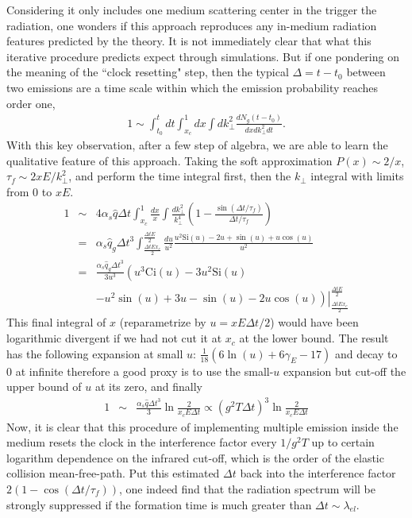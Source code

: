 Considering it only includes one medium scattering center in the trigger the radiation, one wonders if this approach reproduces any in-medium radiation features predicted by the theory.
It is not immediately clear that what this iterative procedure predicts  expect through simulations. 
But if one pondering on the meaning of the ``clock resetting" step, then the typical $\Delta = t-t_0$ between two emissions are a time scale within which the emission probability reaches order one,
\begin{eqnarray}
1 \sim \int_{t_0}^{t} dt\int_{x_c}^1 dx \int dk_\perp^2 \frac{dN_g(t-t_0)}{dx dk_\perp^2 dt}.
\end{eqnarray}
With this key observation, after a few step of algebra, we are able to learn the qualitative feature of this approach.
Taking the soft approximation $P(x) \sim 2/x$, $\tau_f\sim 2xE/k_\perp^2$, and perform the time integral first, then the $k_\perp$ integral with limits from $0$ to $xE$.
\begin{eqnarray}
1 &\sim& 4\alpha_s\hat{q}\Delta t \int_{x_c}^1 \frac{dx}{x} \int \frac{dk_\perp^2}{k_\perp^4}\left(1-\frac{\sin(\Delta t/\tau_f)}{\Delta t/\tau_f}\right)\\
&=& \alpha_s\hat{q}_g \Delta t^3 \int_{\frac{\Delta t E x_c}{2}}^{\frac{\Delta t E}{2}} 
\frac{du}{u^2} \frac{u^2 \mathrm{Si}(u) -2u + \sin(u) + u\cos(u)}{u^2}\\
&=& \frac{\alpha_s\hat{q}_g \Delta t^3}{3u^3} \left(
u^3\mathrm{Ci}(u)-3u^2\mathrm{Si}(u) \right.\\\nonumber
&&\left.\left.- u^2 \sin(u) +3u-\sin(u) - 2u\cos(u)\right)\right|_{\frac{\Delta t E x_c}{2}}^{\frac{\Delta t E}{2}} 
\end{eqnarray}
This final integral of $x$ (reparametrize by $u = xE\Delta t/2$) would have been logarithmic divergent if we had not cut it at $x_c$ at the lower bound.
The result has the following expansion at small $u$: $\frac{1}{18}(6\ln(u)+6\gamma_E - 17)$ and decay to $0$ at infinite therefore a good proxy is to use the small-$u$ expansion but cut-off the upper bound of $u$ at its zero, and finally
\begin{eqnarray}
1 &\sim&  \frac{\alpha_s\hat{q}\Delta t^3}{3}\ln\frac{2}{ x_c E \Delta t } \propto (g^2 T \Delta t)^3 \ln\frac{2}{ x_c E \Delta t }
\end{eqnarray}
Now, it is clear that this procedure of implementing multiple emission inside the medium resets the clock in the interference factor every $1/g^2T$ up to certain logarithm dependence on the infrared cut-off, which is the order of the elastic collision mean-free-path.
Put this estimated $\Delta t$ back into the interference factor $2(1-\cos(\Delta t/\tau_f))$, one indeed find that the radiation spectrum will be strongly suppressed if the formation time is much greater than $\Delta t\sim \lambda_{el}$.

